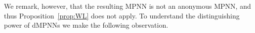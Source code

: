 



We remark, however, that the resulting MPNN is not an anonymous MPNN, and thus Proposition~\ref{prop:WL} does not apply. To understand the distinguishing power of dMPNNs we make the following observation. 

